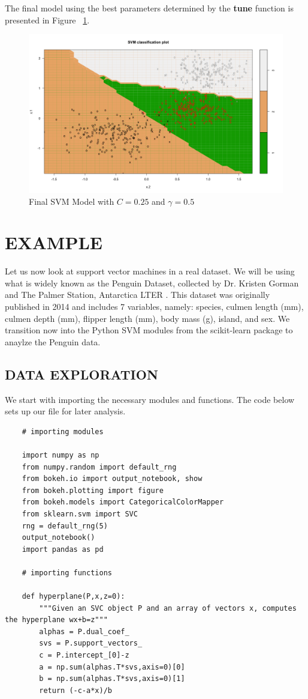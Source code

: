 \documentclass[12pt]{article}
\begin{document}
The final model using the best parameters determined by the \textbf{tune} function is presented in Figure ~\ref{fig_final_svm_model}.

\begin{figure}[H]
    \centering
    \includegraphics[width=5in]{Figures/svm/svm_final_model.png}
    \caption{Final SVM Model with \(C=0.25\) and \(\gamma = 0.5\)}
    \label{fig_final_svm_model}
\end{figure}

\section{EXAMPLE}

Let us now look at support vector machines in a real dataset. We will be using what is widely known as the Penguin Dataset, collected by Dr. Kristen Gorman and The Palmer Station, Antarctica LTER \cite{penguin_data}. This dataset was originally published in 2014 and includes 7 variables, namely: species, culmen length (mm), culmen depth (mm), flipper length (mm), body mass (g), island, and sex. We transition now into the Python SVM modules from the scikit-learn package to anaylze the Penguin data.

\subsection{DATA EXPLORATION}

We start with importing the necessary modules and functions. The code below sets up our file for later analysis.

\begin{verbatim}
    # importing modules
    
    import numpy as np
    from numpy.random import default_rng
    from bokeh.io import output_notebook, show
    from bokeh.plotting import figure
    from bokeh.models import CategoricalColorMapper
    from sklearn.svm import SVC
    rng = default_rng(5)
    output_notebook()
    import pandas as pd

    # importing functions

    def hyperplane(P,x,z=0):
        """Given an SVC object P and an array of vectors x, computes the hyperplane wx+b=z"""
        alphas = P.dual_coef_
        svs = P.support_vectors_
        c = P.intercept_[0]-z
        a = np.sum(alphas.T*svs,axis=0)[0]
        b = np.sum(alphas.T*svs,axis=0)[1]
        return (-c-a*x)/b
\end{verbatim}
\end{document}
